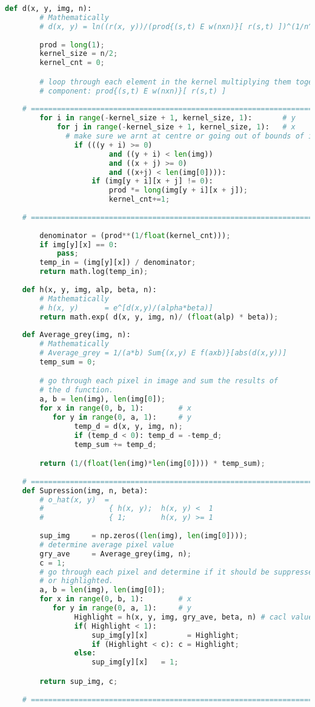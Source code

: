 \newpage
\begin{lstlisting}[language=Python, caption=MIE Implementation Listing 1\label{Listing:1}]
	def d(x, y, img, n):
		# Mathematically
		# d(x, y) = ln((r(x, y))/(prod{(s,t) E w(nxn)}[ r(s,t) ])^(1/n^2))
		
		prod = long(1);
		kernel_size = n/2;
		kernel_cnt = 0;

		# loop through each element in the kernel multiplying them together.
		# component: prod{(s,t) E w(nxn)}[ r(s,t) ]
		
	# =================================================================== #
		for i in range(-kernel_size + 1, kernel_size, 1):		# y
			for j in range(-kernel_size + 1, kernel_size, 1):	# x
			  # make sure we arnt at centre or going out of bounds of img
				if (((y + i) >= 0) 
						and ((y + i) < len(img)) 
						and ((x + j) >= 0) 
						and ((x+j) < len(img[0]))):
					if (img[y + i][x + j] != 0):
						prod *= long(img[y + i][x + j]);
						kernel_cnt+=1;
	
	# =================================================================== #
	
		denominator = (prod**(1/float(kernel_cnt)));
		if img[y][x] == 0:
			pass;
		temp_in = (img[y][x]) / denominator;
		return math.log(temp_in);
		
	def h(x, y, img, alp, beta, n):
		# Mathematically
		# h(x, y)      = e^[d(x,y)/(alpha*beta)]
		return math.exp( d(x, y, img, n)/ (float(alp) * beta));
		
	def Average_grey(img, n):
		# Mathematically
		# Average_grey = 1/(a*b) Sum{(x,y) E f(axb)}[abs(d(x,y))]
		temp_sum = 0;

		# go through each pixel in image and sum the results of 
		# the d function.
		a, b = len(img), len(img[0]);
		for x in range(0, b, 1):        # x
		   for y in range(0, a, 1):     # y
				temp_d = d(x, y, img, n);
				if (temp_d < 0): temp_d = -temp_d;
				temp_sum += temp_d;

		return (1/(float(len(img)*len(img[0]))) * temp_sum);
		
	# =================================================================== #
	def Supression(img, n, beta):					
		# o_hat(x, y)  = 							    	
		#				{ h(x, y);	h(x, y) <  1	
		#				{ 1;		h(x, y) >= 1	   
		
		sup_img     = np.zeros((len(img), len(img[0])));
		# determine average pixel value							
		gry_ave     = Average_grey(img, n);
		c = 1;
		# go through each pixel and determine if it should be suppressed 
		# or highlighted.
		a, b = len(img), len(img[0]);
		for x in range(0, b, 1):        # x
		   for y in range(0, a, 1):     # y
				Highlight = h(x, y, img, gry_ave, beta, n) # cacl value
				if( Highlight < 1):
					sup_img[y][x]         = Highlight;
					if (Highlight < c): c = Highlight;
				else:
					sup_img[y][x]   = 1;

		return sup_img, c;
		
	# =================================================================== #
\end{lstlisting}

